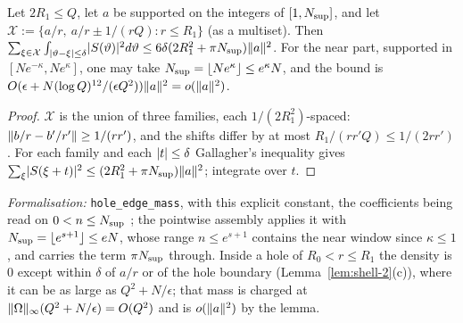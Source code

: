 \begin{lemma}\label{lem:shell-F1}
Let $2R_1\le Q$, let $a$ be supported on the integers of $[1,N_{\rm sup}]$, and let $\mathcal X:=\{a/r,\ a/r\pm1/(rQ):r\le R_1\}$ (as a multiset). Then
$\sum_{\xi\in\mathcal X}\int_{\lvert \vartheta-\xi\rvert\le\delta}\lvert S(\vartheta)\rvert^2d\vartheta\le6\delta(2R_1^2+\pi N_{\rm sup})\lVert a\rVert^2$. For the near part, supported in
$[Ne^{-\kappa},Ne^\kappa]$, one may take $N_{\rm sup}=\lfloor Ne^\kappa\rfloor\le e^\kappa N$, and the bound is
$O(\epsilon+N(\log Q)^{12}/(\epsilon Q^2))\lVert a\rVert^2=o(\lVert a\rVert^2)$.
\end{lemma}
\begin{proof}
$\mathcal X$ is the union of three families, each $1/(2R_1^2)$-spaced: $\lVert b/r-b'/r'\rVert\ge1/(rr')$, and the shifts differ by at most
$R_1/(rr'Q)\le1/(2rr')$. For each family and each $\lvert t\rvert\le\delta$ Gallagher's inequality gives $\sum_\xi\lvert S(\xi+t)\rvert^2\le(2R_1^2+\pi N_{\rm sup})\lVert a\rVert^2$;
integrate over $t$.
\end{proof}
\emph{Formalisation:} \texttt{hole\_edge\_mass}, with this explicit constant, the coefficients being read on $0<n\le N_{\rm sup}$
\tagL; the pointwise assembly applies it with $N_{\rm sup}=\lfloor e^{s+1}\rfloor\le eN$, whose range $n\le e^{s+1}$ contains the near window since $\kappa\le1$,
and carries the term $\pi N_{\rm sup}$ through. Inside a hole of $R_0<r\le R_1$ the density is
$0$ except within $\delta$ of $a/r$ or of the hole boundary (Lemma~\ref{lem:shell-2}(c)), where it can be as large as $Q^2+N/\epsilon$; that mass is
charged at $\lVert \Omega\rVert_\infty(Q^2+N/\epsilon)=O(Q^2)$ and is $o(\lVert a\rVert^2)$ by the lemma.


